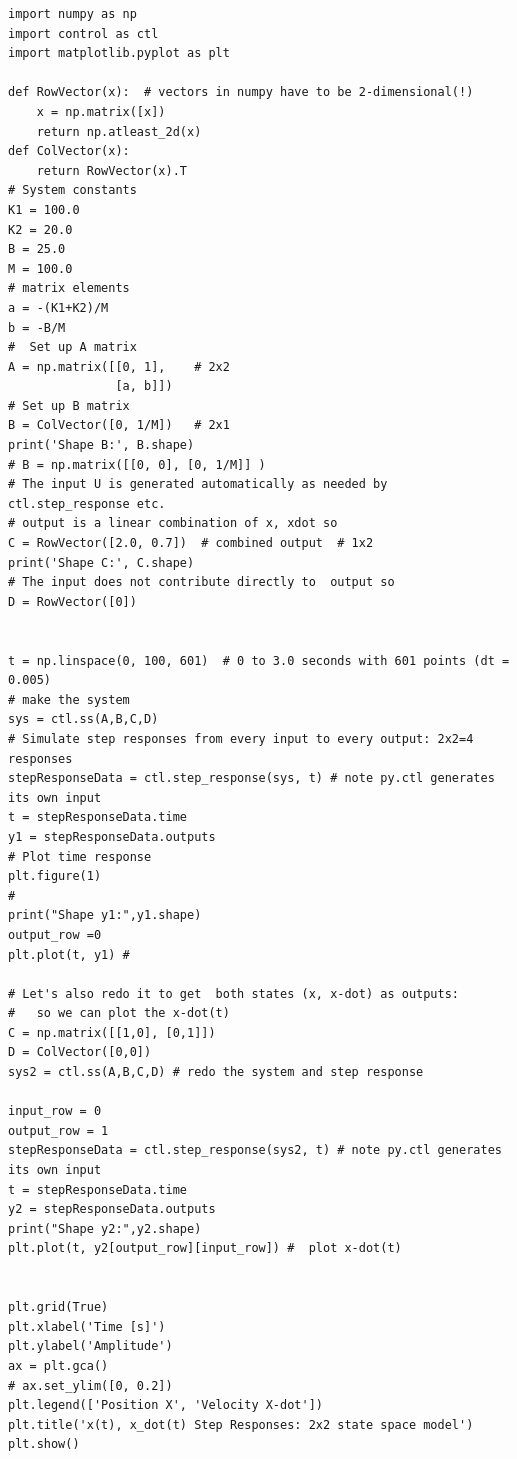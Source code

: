\begin{listing}
\begin{verbatim}
import numpy as np
import control as ctl
import matplotlib.pyplot as plt

def RowVector(x):  # vectors in numpy have to be 2-dimensional(!)
    x = np.matrix([x])
    return np.atleast_2d(x)
def ColVector(x):
    return RowVector(x).T
# System constants
K1 = 100.0
K2 = 20.0
B = 25.0
M = 100.0
# matrix elements
a = -(K1+K2)/M
b = -B/M
#  Set up A matrix
A = np.matrix([[0, 1],    # 2x2
               [a, b]])
# Set up B matrix
B = ColVector([0, 1/M])   # 2x1
print('Shape B:', B.shape)
# B = np.matrix([[0, 0], [0, 1/M]] )
# The input U is generated automatically as needed by ctl.step_response etc.
# output is a linear combination of x, xdot so
C = RowVector([2.0, 0.7])  # combined output  # 1x2
print('Shape C:', C.shape)
# The input does not contribute directly to  output so
D = RowVector([0])


t = np.linspace(0, 100, 601)  # 0 to 3.0 seconds with 601 points (dt = 0.005)
# make the system
sys = ctl.ss(A,B,C,D)
# Simulate step responses from every input to every output: 2x2=4 responses
stepResponseData = ctl.step_response(sys, t) # note py.ctl generates its own input
t = stepResponseData.time
y1 = stepResponseData.outputs
# Plot time response
plt.figure(1)
#
print("Shape y1:",y1.shape)
output_row =0
plt.plot(t, y1) #

# Let's also redo it to get  both states (x, x-dot) as outputs:
#   so we can plot the x-dot(t)
C = np.matrix([[1,0], [0,1]])
D = ColVector([0,0])
sys2 = ctl.ss(A,B,C,D) # redo the system and step response

input_row = 0
output_row = 1
stepResponseData = ctl.step_response(sys2, t) # note py.ctl generates its own input
t = stepResponseData.time
y2 = stepResponseData.outputs
print("Shape y2:",y2.shape)
plt.plot(t, y2[output_row][input_row]) #  plot x-dot(t)


plt.grid(True)
plt.xlabel('Time [s]')
plt.ylabel('Amplitude')
ax = plt.gca()
# ax.set_ylim([0, 0.2])
plt.legend(['Position X', 'Velocity X-dot'])
plt.title('x(t), x_dot(t) Step Responses: 2x2 state space model')
plt.show()
    \end{verbatim}
    \caption{{\tt python.control} State Space setup for the Auto suspension system example {\bf (an old version ?????  )}.}
    \label{lst:4x4ssSetup}
\end{listing}


